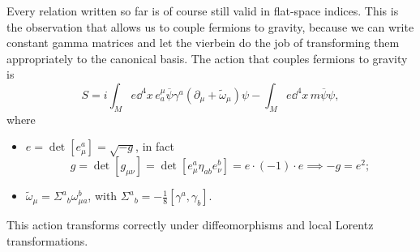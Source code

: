 \documentclass[a4paper,12pt]{book}
\begin{document}
Every relation written so far is of course still valid in flat-space indices. This is the observation that allows us to couple fermions to gravity, because we can write constant gamma matrices and let the vierbein do the job of transforming them appropriately to the canonical basis. The action that couples fermions to gravity is
\[S=i\int_Me\dd^4x\,e^\mu_a\overline\psi\gamma^a(\partial_\mu+\tilde\omega_\mu)\psi-\int_Me\dd^4x\,m\overline\psi\psi,\]
where
\begin{itemize}
\item $e=\det[e^a_\mu]=\sqrt{-g}$, in fact
\[g=\det[g_{\mu\nu}]=\det[e^a_\mu\eta_{ab}e^b_\nu]=e\cdot(-1)\cdot e\implies -g=e^2;\]
\item $\tilde\omega_\mu=\Sigma^a{}_b\omega^b_{\mu a}$, with $\Sigma^a{}_b=-\frac{1}{8}[\gamma^a,\gamma_b]$.
\end{itemize}
This action transforms correctly under diffeomorphisms and local Lorentz transformations.
\end{document}
